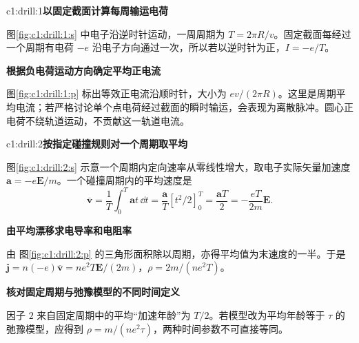 \LectureAnswerSection

\begin{drillsolution}{c1:drill:1}\textbf{以固定截面计算每周输运电荷}\par\nobreak
图\ref{fig:c1:drill:1:s} 中电子沿逆时针运动，一周周期为 $T=2\pi R/v$。固定截面每经过一个周期有电荷 $-e$ 沿电子方向通过一次，所以若以逆时针为正，$I=-e/T$。



\par\medskip{}\noindent\textbf{根据负电荷运动方向确定平均正电流}\par\nobreak
图\ref{fig:c1:drill:1:p} 标出等效正电流沿顺时针，大小为 $ev/(2\pi R)$。这里是周期平均电流；若严格讨论单个点电荷经过截面的瞬时输运，会表现为离散脉冲。圆心正电荷不绕轨道运动，不贡献这一轨道电流。\end{drillsolution}
\begin{drillsolution}{c1:drill:2}\textbf{按指定碰撞规则对一个周期取平均}\par\nobreak
图\ref{fig:c1:drill:2:s} 示意一个周期内定向速率从零线性增大，取电子实际矢量加速度 $\bm a=-e\bm E/m$。一个碰撞周期内的平均速度是
\[
 \overline{\bm v}=\frac1T\int_0^T\bm a t\,\dd t
 =\frac{\bm a}{T}[t^2/2]_0^T
=\frac{\bm aT}{2}=-\frac{eT}{2m}\bm E.
\]



\par\medskip{}\noindent\textbf{由平均漂移求电导率和电阻率}\par\nobreak
由 图\ref{fig:c1:drill:2:p} 的三角形面积除以周期，亦得平均值为末速度的一半。于是 $\bm j=n(-e)\overline{\bm v}=ne^2T\bm E/(2m)$，$\rho=2m/(ne^2T)$。

\par\medskip{}\noindent\textbf{核对固定周期与弛豫模型的不同时间定义}\par\nobreak
因子 $2$ 来自固定周期中的平均“加速年龄”为 $T/2$。若模型改为平均年龄等于 $\tau$ 的弛豫模型，应得到 $\rho=m/(ne^2\tau)$，两种时间参数不可直接等同。\end{drillsolution}
